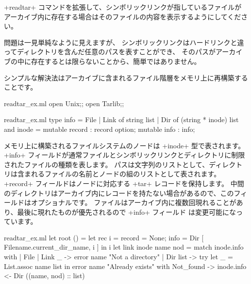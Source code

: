 \begin{exercise}\label{ex/readtar}
\ml+readtar+ コマンドを拡張して、シンボリックリンクが指しているファイルが
アーカイブ内に存在する場合はそのファイルの内容を表示するようにしてください。
\end{exercise}
\begin{answer}
問題は一見単純なように見えますが、
シンボリックリンクはハードリンクと違ってディレクトリを含んだ任意のパスを表すことができ、
そのパスがアーカイブの中に存在するとは限らないことから、簡単ではありません。

シンプルな解決法はアーカイブに含まれるファイル階層をメモリ上に再構築することです。
%
\begin{codefile}{readtar_ex.ml}
open Unix;;
open Tarlib;;
\end{codefile}
%
\begin{listingcodefile}{readtar_ex.ml}
type info = File | Link of string list | Dir of (string * inode) list
and inode = { mutable record : record option; mutable info : info;}
\end{listingcodefile}
%
メモリ上に構築されるファイルシステムのノードは \ml+inode+ 型で表されます。
\ml+info+ フィールドが通常ファイルとシンボリックリンクとディレクトリに制限されたファイルの種類を表します。
パスは文字列のリストとして、ディレクトリは含まれるファイルの名前とノードの組のリストとして表されます。
\ml+record+ フィールドはノードに対応する \ml+tar+ レコードを保持します。
中間のディレクトリはアーカイブ内にレコードを持たない場合があるので、このフィールドはオプショナルです。
ファイルはアーカイブ内に複数回現れることがあり、最後に現れたものが優先されるので \ml+info+ フィールド
は変更可能になっています。
%
\begin{listingcodefile}{readtar_ex.ml}
let root () =
  let rec i =
    { record = None; info = Dir [ Filename.current_dir_name, i ] }
  in i
let link inode name nod = match inode.info with
  | File | Link _ -> error name "Not a directory"
  | Dir list ->
      try let _ = List.assoc name list in error name "Already exists"
      with Not_found -> inode.info <- Dir ((name, nod) :: list)


\end{listingcodefile}
\end{answer}
